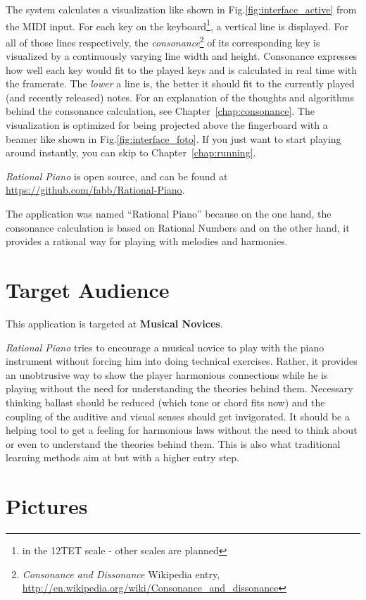 \documentclass[12pt,a4paper,titlepage,oneside]{report}
\begin{document}
The system calculates a visualization like shown in Fig.\ref{fig:interface_active} from the MIDI input. For each key on the keyboard\footnote{in the 12TET scale - other scales are planned}, a vertical line is displayed. For all of those lines respectively, the \emph{consonance}\footnote{\label{foot:cons}\emph{Consonance and Dissonance} Wikipedia entry, \url{http://en.wikipedia.org/wiki/Consonance_and_dissonance}} of its corresponding key is visualized by a continuously varying line width and height. Consonance expresses how well each key would fit to the played keys and is calculated in real time with the framerate. The \emph{lower} a line is, the better it should fit to the currently played (and recently released) notes. For an explanation of the thoughts and algorithms behind the consonance calculation, see Chapter~\ref{chap:consonance}. The visualization is optimized for being projected above the fingerboard with a beamer like shown in Fig.\ref{fig:interface_foto}. If you just want to start playing around instantly, you can skip to Chapter~\ref{chap:running}.

\emph{Rational Piano} is open source, and can be found at \url{https://github.com/fabb/Rational-Piano}.

The application was named ``Rational Piano'' because on the one hand, the consonance calculation is based on Rational Numbers and on the other hand, it provides a rational way for playing with melodies and harmonies.


\section{Target Audience}

This application is targeted at \textbf{Musical Novices}.

\emph{Rational Piano} tries to encourage a musical novice to play with the piano instrument without forcing him into doing technical exercises. Rather, it provides an unobtrusive way to show the player harmonious connections while he is playing without the need for understanding the theories behind them. Necessary thinking ballast should be reduced (which tone or chord fits now) and the coupling of the auditive and visual senses should get invigorated. It should be a helping tool to get a feeling for harmonious laws without the need to think about or even to understand the theories behind them. This is also what traditional learning methods aim at but with a higher entry step.


\section{Pictures}
\end{document}
